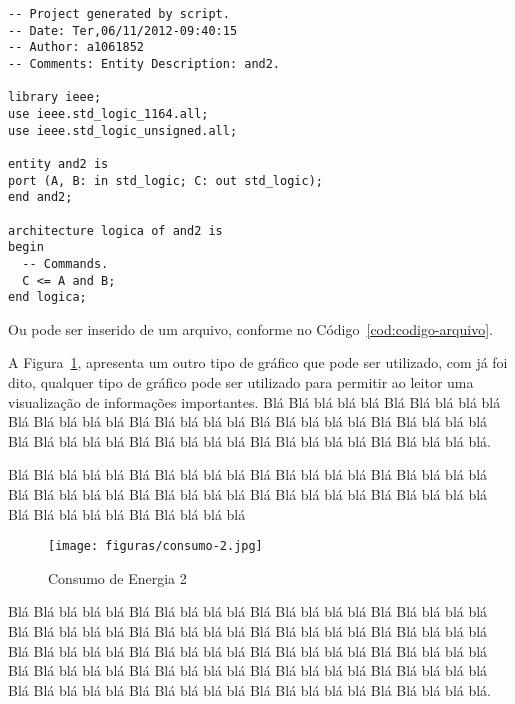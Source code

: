 \documentclass[times, 10pt,twocolumn]{article}
\begin{document}
\begin{lstlisting}[label=cod:codigo-direto,caption=Descrição VHDL de uma Porta AND de duas entradas.]
-- Project generated by script.
-- Date: Ter,06/11/2012-09:40:15
-- Author: a1061852
-- Comments: Entity Description: and2.
 
library ieee;
use ieee.std_logic_1164.all;
use ieee.std_logic_unsigned.all;
 
entity and2 is
port (A, B: in std_logic; C: out std_logic);
end and2;
 
architecture logica of and2 is
begin
  -- Commands.
  C <= A and B;
end logica;
\end{lstlisting}

Ou pode ser inserido de um arquivo, conforme no Código~{\ref{cod:codigo-arquivo}}.



A Figura~{\ref{fig:figura-003}}, apresenta um outro tipo de gráfico que pode ser utilizado, com já foi dito, qualquer tipo de gráfico pode ser utilizado para permitir ao leitor uma visualização de informações importantes.
Blá Blá blá blá blá Blá Blá blá blá blá Blá Blá blá blá blá Blá Blá blá blá blá Blá Blá blá blá blá Blá Blá blá blá blá Blá Blá blá blá blá Blá Blá blá blá blá Blá Blá blá blá blá Blá Blá blá blá blá.

Blá Blá blá blá blá Blá Blá blá blá blá Blá Blá blá blá blá Blá Blá blá blá blá Blá Blá blá blá blá Blá Blá blá blá blá Blá Blá blá blá blá Blá Blá blá blá blá Blá Blá blá blá blá Blá Blá blá blá blá

\begin{figure}[h]
    \centering
    \texttt{[image: figuras/consumo-2.jpg]}
    \caption{Consumo de Energia 2}
    \label{fig:figura-003}
\end{figure}

Blá Blá blá blá blá Blá Blá blá blá blá Blá Blá blá blá blá Blá Blá blá blá blá Blá Blá blá blá blá Blá Blá blá blá blá Blá Blá blá blá blá Blá Blá blá blá blá Blá Blá blá blá blá Blá Blá blá blá blá
Blá Blá blá blá blá Blá Blá blá blá blá Blá Blá blá blá blá Blá Blá blá blá blá Blá Blá blá blá blá Blá Blá blá blá blá Blá Blá blá blá blá Blá Blá blá blá blá Blá Blá blá blá blá Blá Blá blá blá blá.
\end{document}
